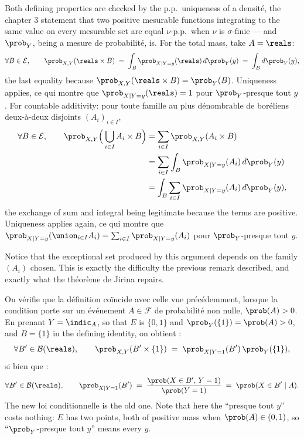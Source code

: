 Both defining properties are checked by the p.p.\ uniqueness of a densité, the
chapter 3 statement that two positive mesurable functions integrating to the
same value on every mesurable set are equal $\nu$-p.p.\ when $\nu$ is
$\sigma$-finie --- and $\prob_{Y}$, being a mesure de probabilité, is. For the
total mass, take $A = \reals$:
\[
  \forall B \in \mathcal{E}, \qquad
  \prob_{X,Y}(\reals \times B) \;=\; \int_{B} \prob_{X \mid Y = y}(\reals) \, d\prob_{Y}(y)
  \;=\; \int_{B} d\prob_{Y}(y) ,
\]
the last equality because $\prob_{X,Y}(\reals \times B) = \prob_{Y}(B)$. Uniqueness
applies, ce qui montre que $\prob_{X \mid Y = y}(\reals) = 1$ pour
$\prob_{Y}$-presque tout $y$. For countable additivity: pour toute famille au plus
dénombrable de boréliens deux-à-deux disjoints $(A_{i})_{i \in I}$,
\begin{align*}
  \forall B \in \mathcal{E}, \qquad
  \prob_{X,Y}\Big( \bigcup_{i \in I} A_{i} \times B \Big)
  &= \sum_{i \in I} \prob_{X,Y}(A_{i} \times B) \\
  &= \sum_{i \in I} \int_{B} \prob_{X \mid Y = y}(A_{i}) \, d\prob_{Y}(y) \\
  &= \int_{B} \sum_{i \in I} \prob_{X \mid Y = y}(A_{i}) \, d\prob_{Y}(y) ,
\end{align*}
the exchange of sum and integral being legitimate because the terms are positive.
Uniqueness applies again, ce qui montre que
$\prob_{X \mid Y = y}(\union_{i \in I} A_{i}) = \sum_{i \in I} \prob_{X \mid Y = y}(A_{i})$
pour $\prob_{Y}$-presque tout $y$.

\begin{remark}
  Notice that the exceptional set produced by this argument depends on the family
  $(A_{i})$ chosen. This is exactly the difficulty the previous remark described,
  and exactly what the théorème de Jirina repairs.
\end{remark}

On vérifie que la définition coïncide avec celle vue précédemment, lorsque la
condition porte sur un événement $A \in \mathcal{F}$ de probabilité non nulle,
$\prob(A) > 0$. En prenant $Y = \indic_{A}$, so that $E$ is $\{0,1\}$ and
$\prob_{Y}(\{1\}) = \prob(A) > 0$, and $B = \{1\}$ in the defining identity, on
obtient :
\[
  \forall B' \in \mathcal{B}(\reals), \qquad
  \prob_{X,Y}(B' \times \{1\}) \;=\; \prob_{X \mid Y = 1}(B') \, \prob_{Y}(\{1\}) ,
\]
si bien que :
\[
  \forall B' \in \mathcal{B}(\reals), \qquad
  \prob_{X \mid Y = 1}(B') \;=\; \frac{\prob(X \in B', \, Y = 1)}{\prob(Y = 1)}
  \;=\; \prob(X \in B' \mid A) .
\]
The new loi conditionnelle is the old one. Note that here the ``presque tout $y$''
costs nothing: $E$ has two points, both of positive mass when $\prob(A) \in (0,1)$,
so ``$\prob_{Y}$-presque tout $y$'' means every $y$.

